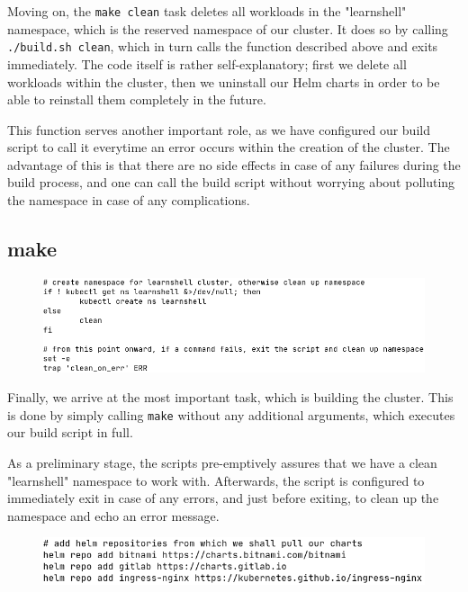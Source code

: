 \documentclass[thesis=B,english]{FITthesis}[2019/12/23]
\begin{document}
Moving on, the \verb|make clean| task deletes all workloads in the "learnshell" namespace, which is the reserved namespace of our cluster. It does so by calling \verb|./build.sh clean|, which in turn calls the function described above and exits immediately. The code itself is rather self-explanatory; first we delete all workloads within the cluster, then we uninstall our Helm charts in order to be able to reinstall them completely in the future.

This function serves another important role, as we have configured our build script to call it everytime an error occurs within the creation of the cluster. The advantage of this is that there are no side effects in case of any failures during the build process, and one can call the build script without worrying about polluting the namespace in case of any complications.

\subsection{make}

\begin{figure}[H]
\centering
\hspace*{-0.5cm}
\includegraphics[scale=0.5]{build-namespace}
\end{figure}

Finally, we arrive at the most important task, which is building the cluster. This is done by simply calling \verb|make| without any additional arguments, which executes our build script in full. 

As a preliminary stage, the scripts pre-emptively assures that we have a clean "learnshell" namespace to work with. Afterwards, the script is configured to immediately exit in case of any errors, and just before exiting, to clean up the namespace and echo an error message.

\begin{figure}[H]
\centering
\hspace*{-1.5cm}
\includegraphics[scale=0.5]{build-helm1}
\end{figure}
\end{document}
